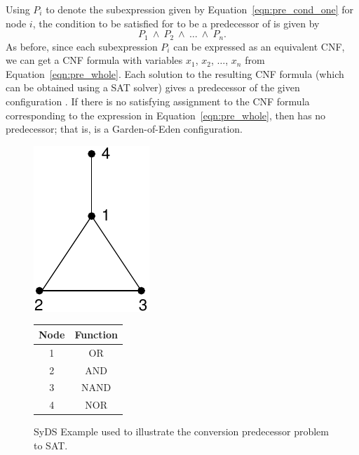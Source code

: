 Using $P_i$ to denote the subexpression given by Equation~\eqref{eqn:pre_cond_one}
for node $i$, the condition to be satisfied for \calcp{} to be a 
predecessor of \calc{} is given by 
\begin{equation}\label{eqn:pre_whole}
P_1 ~\wedge~ P_2 ~\wedge~ \ldots ~\wedge~ P_n.
\end{equation}
As before, since each subexpression $P_i$ can be expressed as an equivalent CNF, 
we can get a CNF formula with variables $x_1$, $x_2$, $\ldots$, $x_n$
from Equation~\eqref{eqn:pre_whole}. 
Each solution to the resulting CNF formula (which can be obtained using
a SAT solver) gives a predecessor of the given configuration \calc.
If there is no satisfying assignment to the CNF formula corresponding
to the expression in Equation~\eqref{eqn:pre_whole}, then \calc{}
has no predecessor; that is, \calc{} is a Garden-of-Eden configuration.


\begin{figure}[tbh]
\begin{minipage}{0.5\textwidth}
\centering
\includegraphics[scale=0.75]{./graph_example.pdf}
\end{minipage}
\hspace*{0.25in}
\begin{minipage}{0.4\textwidth}
\smallskip
\noindent
\begin{tabular}{|c|c|}\hline
\textbf{Node} & \textbf{Function} \\ \hline
1  &  OR \\ \hline
2  &  AND \\ \hline
3  &  NAND \\ \hline
4  &  NOR \\ \hline
\end{tabular}
\end{minipage}
\caption{\small{SyDS Example used to illustrate
the conversion predecessor problem to SAT.}}
\label{fig:syds_ex}
\end{figure}

